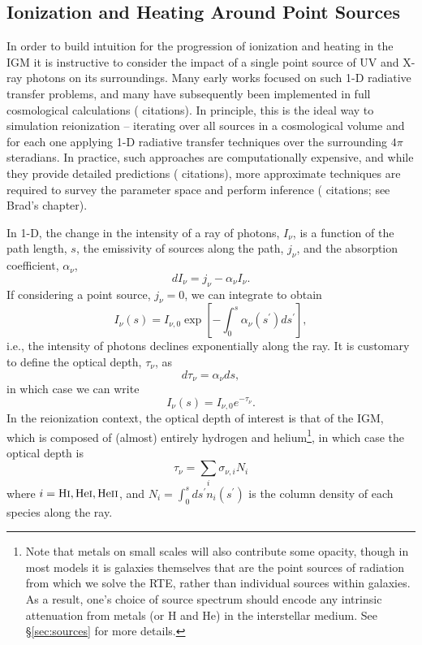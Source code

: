 \subsection{Ionization and Heating Around Point Sources} \label{sec:smallscales}
In order to build intuition for the progression of ionization and heating in the IGM it is instructive to consider the impact of a single point source of UV and X-ray photons on its surroundings. Many early works focused on such 1-D radiative transfer problems, and many have subsequently been implemented in full cosmological calculations ({\color{red} citations}). In principle, this is the ideal way to simulation reionization -- iterating over all sources in a cosmological volume and for each one applying 1-D radiative transfer techniques over the surrounding $4\pi$ steradians. In practice, such approaches are computationally expensive, and while they provide detailed predictions ({\color{red} citations}), more approximate techniques are required to survey the parameter space and perform inference ({\color{red} citations; see Brad's chapter}).

In 1-D, the change in the intensity of a ray of photons, $I_{\nu}$, is a function of the path length, $s$, the emissivity of sources along the path, $j_{\nu}$, and the absorption coefficient, $\alpha_{\nu}$, 
\begin{equation}
	dI_{\nu} = j_{\nu} - \alpha_{\nu} I_{\nu} .
\end{equation}
If considering a point source, $j_{\nu} = 0$, we can integrate to obtain
\begin{equation}
	I_{\nu}(s) = I_{\nu,0} \exp\left[-\int_0^s \alpha_{\nu}(s^{\prime}) ds^{\prime} \right] ,
\end{equation}
i.e., the intensity of photons declines exponentially along the ray. It is customary to define the optical depth, $\tau_{\nu}$, as
\begin{equation}
	d\tau_{\nu} = \alpha_{\nu} ds ,
\end{equation}
in which case we can write
\begin{equation}
	I_{\nu}(s) = I_{\nu,0} e^{-\tau_{\nu}} .
\end{equation}
In the reionization context, the optical depth of interest is that of the IGM, which is composed of (almost) entirely hydrogen and helium\footnote{Note that metals on small scales will also contribute some opacity, though in most models it is galaxies themselves that are the point sources of radiation from which we solve the RTE, rather than individual sources within galaxies. As a result,  one's choice of source spectrum should encode any intrinsic attenuation from metals (or H and He) in the interstellar medium. See \S\ref{sec:sources} for more details.}, in which case the optical depth is 
\begin{equation}
	\tau_{\nu} = \sum_i \sigma_{\nu,i} N_i
\end{equation}
where $i=\text{H} {\textsc{i}},\text{He} {\textsc{i}},\text{He} {\textsc{ii}}$, and $N_i = \int_0^s ds^{\prime} n_i(s^{\prime})$ is the column density of each species along the ray.

